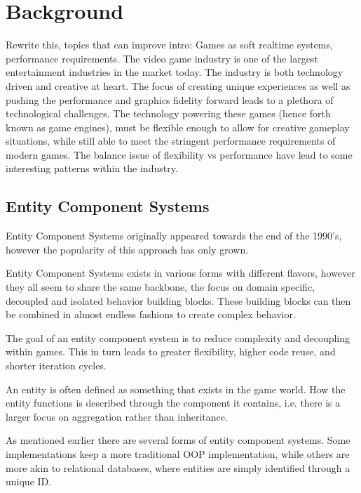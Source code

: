 \section*{Background}

\todo
{Rewrite this, topics that can improve intro: Games as soft realtime systems, performance requirements.}
The video game industry is one of the largest entertainment industries in the market today.
The industry is both technology driven and creative at heart. 
The focus of creating unique experiences as well as pushing the performance and graphics fidelity forward leads to a plethora of technological challenges.
The technology powering these games (hence forth known as game engines), must be flexible enough to allow for creative gameplay situations, while still able to meet the stringent performance requirements of modern games.
The balance issue of flexibility vs performance have lead to some interesting patterns within the industry.

\subsection*{Entity Component Systems}
Entity Component Systems originally appeared towards the end of the 1990's, however the popularity of this approach has only grown. \cite{wikipedia_ecs_history}

Entity Component Systems exists in various forms with different flavors, however they all seem to share the same backbone, the focus on domain specific, decoupled and isolated behavior building blocks.
These building blocks can then be combined in almost endless fashions to create complex behavior. 

The goal of an entity component system is to reduce complexity and decoupling within games. This in turn leads to greater flexibility, higher code reuse, and shorter iteration cycles. 

An entity is often defined as something that exists in the game world. How the entity functions is described through the component it contains, i.e. there is a larger focus on aggregation rather than inheritance. 

As mentioned earlier there are several forms of entity component systems. Some implementations keep a more traditional OOP implementation, 
while others are more akin to relational databases, where entities are simply identified through a unique ID. \cite{t_machine_ecs_are_the_future_p2} 

